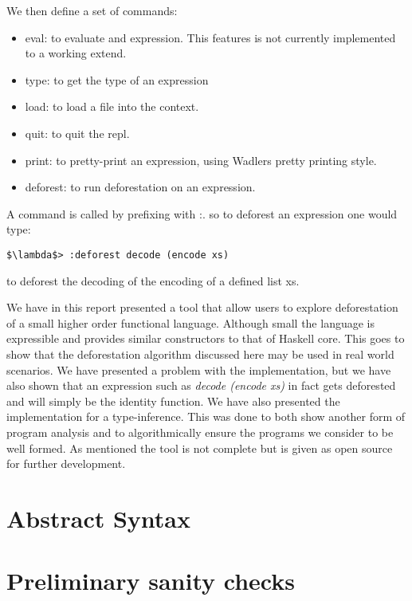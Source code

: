 \documentclass[a4paper, openany]{article}
\begin{document}
We then define a set of commands:
\begin{itemize}
\item eval: to evaluate and expression. This features is not currently implemented to a working extend.
\item type: to get the type of an expression
\item load: to load a file into the context.
\item quit: to quit the repl.
\item print: to pretty-print an expression, using Wadlers pretty printing style.
\item deforest: to run deforestation on an expression.
\end{itemize}

A command is called by prefixing with :. so to deforest an expression one would type:
\begin{lstlisting}[mathescape=true]
$\lambda$> :deforest decode (encode xs)
\end{lstlisting}
to deforest the decoding of the encoding of a defined list xs.

We have in this report presented a tool that allow users to explore deforestation of a small higher order functional language. Although small the language is expressible and provides similar constructors to that of Haskell core. This goes to show that the deforestation algorithm discussed here may be used in real world scenarios. We have presented a problem with the implementation, but we have also shown that an expression such as \emph{decode (encode xs)} in fact gets deforested and will simply be the identity function.
We have also presented the implementation for a type-inference. This was done to both show another form of program analysis and to algorithmically ensure the programs we consider to be well formed.
As mentioned the tool is not complete but is given as open source for further development.

\printbibliography

\appendix

\section{Abstract Syntax}
\label{sec:orgca5da17}



\section{Preliminary sanity checks}
\label{sec:appsanity}

\end{document}
